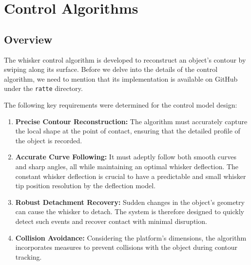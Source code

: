 

\chapter{Control Algorithms}


\section{Overview}

The whisker control algorithm is developed to reconstruct an object's contour by swiping along its surface.
Before we delve into the details of the control algorithm, we need to mention that its implementation is available on GitHub\cite{ratte-github} under the \texttt{ratte} directory.

The following key requirements were determined for the control model design:

\begin{enumerate}
    \item \textbf{Precise Contour Reconstruction:} The algorithm must accurately capture the local shape at the point of contact, ensuring that the detailed profile of the object is recorded.
    \item \textbf{Accurate Curve Following:} It must adeptly follow both smooth curves and sharp angles, all while maintaining an optimal whisker deflection. The constant whisker deflection is crucial to have a predictable and small whisker tip position resolution by the deflection model.
    \item \textbf{Robust Detachment Recovery:} Sudden changes in the object's geometry can cause the whisker to detach. The system is therefore designed to quickly detect such events and recover contact with minimal disruption.
    \item \textbf{Collision Avoidance:} Considering the platform's dimensions, the algorithm incorporates measures to prevent collisions with the object during contour tracking.
\end{enumerate}


